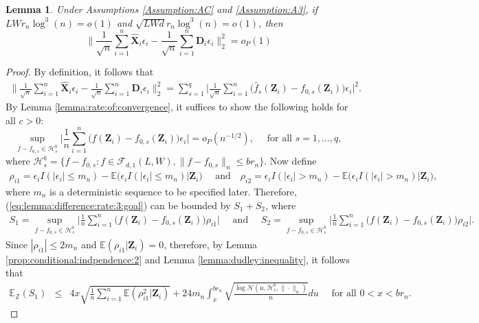 \documentclass[11pt, preprint]{imsart}
\numberwithin{equation}{section}
\def \mcF{\mathcal{F}}
\def \mcH{\mathcal{H}}
\def \mcN{\mathcal{N}}
\def \bfD{\mathbf{D}}
\def \bfX{\mathbf{X}}
\def \bfZ{\mathbf{Z}}
\def \bfD{\mathbf{D}}
\def \ev{\mathbb{E}}
\theoremstyle{plain}
\newtheorem{lemma}{\indent Lemma}
\theoremstyle{definition}
\begin{document}
\begin{lemma}\label{lemma:difference:rate:3}
Under Assumptions \ref{Assumption:AC} and \ref{Assumption:A3}, if $LWr_n\log^3(n)=o(1)$ and  $\sqrt{LWd}r_n\log^3(n)=o(1)$, then 
$$\bigg\|\frac{1}{\sqrt{n}}\sum_{i=1}^n\widehat{\bfX}_i\epsilon_i-\frac{1}{\sqrt{n}}\sum_{i=1}^n{\bfD}_i\epsilon_i\bigg\|_2^2=o_P(1)$$
\end{lemma}
\begin{proof}
By definition, it follows that
\begin{eqnarray*}
	\bigg\|\frac{1}{\sqrt{n}}\sum_{i=1}^n\widehat{\bfX}_i\epsilon_i-\frac{1}{\sqrt{n}}\sum_{i=1}^n{\bfD}_i\epsilon_i\bigg\|^2_2=\sum_{s=1}^q\bigg|\frac{1}{\sqrt{n}}\sum_{i=1}^n\bigg(\widehat{f}_s(\bfZ_i)-f_{0,s}(\bfZ_i)\bigg)\epsilon_i\bigg|^2.
\end{eqnarray*}
By Lemma \ref{lemma:rate:of:convergence}, it suffices to show the following holds for all $c>0$:
\begin{equation}\label{eq:lemma:difference:rate:3:goal}
	\sup_{f-f_{0,s}\in \mcH_s^b}\bigg|\frac{1}{n}\sum_{i=1}^n\bigg(f(\bfZ_i)-f_{0,s}(\bfZ_i)\bigg)\epsilon_i\bigg|=o_P(n^{-1/2}),\quad \textrm{ for all } s=1,\ldots, q,
\end{equation}
where $\mcH_s^b=\{f-f_{0,s} :  f\in \mcF_{d,1}(L, W), \|f-f_{0,s}\|_n\leq  br_n\}$. Now define 
\begin{eqnarray}
	\rho_{i1}=\epsilon_i I(|\epsilon_i|\leq m_n)-\ev\bigg(\epsilon_i I(|\epsilon_i|\leq m_n)\bigg| \bfZ_i\bigg)\quad \textrm{ and}\quad \rho_{i2}=\epsilon_i I(|\epsilon_i|> m_n)-\ev\bigg(\epsilon_i I(|\epsilon_i|> m_n)\bigg| \bfZ_i\bigg),\nonumber
\end{eqnarray}
where $m_n$ is a deterministic sequence to be specified later. Therefore, (\ref{eq:lemma:difference:rate:3:goal}) can be bounded by $S_1+S_2$, where
\begin{eqnarray}
	S_1=\sup_{f-f_{0,s}\in \mcH_s^b}\bigg|\frac{1}{n}\sum_{i=1}^n\bigg(f(\bfZ_i)-f_{0,s}(\bfZ_i)\bigg)\rho_{i1}\bigg|\quad \textrm{ and }\quad S_2=\sup_{f-f_{0,s}\in \mcH_s^b}\bigg|\frac{1}{n}\sum_{i=1}^n\bigg(f(\bfZ_i)-f_{0,s}(\bfZ_i)\bigg)\rho_{i2}\bigg|.\nonumber
\end{eqnarray}
Since $|\rho_{i1}|\leq 2m_n$ and $\ev(\rho_{i1}|\bfZ	_i)=0$, therefore, by Lemma \ref{prop:conditional:indpendence:2} and Lemma \ref{lemma:dudley:inequality}, it follows that
\begin{eqnarray}
	\ev_{\mathbb{Z}}(S_1)&\leq&4x\sqrt{\frac{1}{n}\sum_{i=1}^n\ev(\rho_{i1}^2 |\bfZ_i)}+24m_n\int_{x}^{br_n}\sqrt{\frac{\log \mcN(u, \mcH_s^b, \|\cdot\|_n)}{n}}du\quad \textrm{ for all } 0<x<br_n.\nonumber

\end{eqnarray}
\end{proof}
\end{document}
